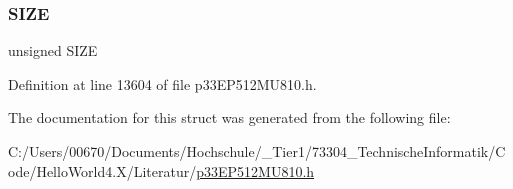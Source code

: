 \subsubsection{\texorpdfstring{S\+I\+ZE}{SIZE}}
{\footnotesize\ttfamily unsigned S\+I\+ZE}



Definition at line 13604 of file p33\+E\+P512\+M\+U810.\+h.



The documentation for this struct was generated from the following file\+:\begin{DoxyCompactItemize}
\item 
C\+:/\+Users/00670/\+Documents/\+Hochschule/\+\_\+\+Tier1/73304\+\_\+\+Technische\+Informatik/\+Code/\+Hello\+World4.\+X/\+Literatur/\hyperlink{p33_e_p512_m_u810_8h}{p33\+E\+P512\+M\+U810.\+h}\end{DoxyCompactItemize}
